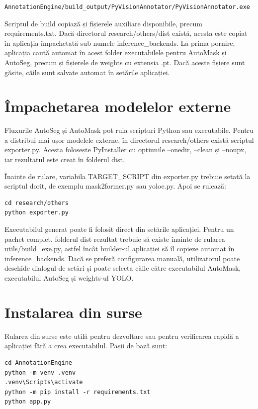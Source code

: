 \begin{verbatim}
AnnotationEngine/build_output/PyVisionAnnotator/PyVisionAnnotator.exe
\end{verbatim}

Scriptul de build copiază și fișierele auxiliare disponibile, precum requirements.txt. Dacă directorul research/others/dist există, acesta este copiat în aplicația împachetată sub numele inference\_backends. La prima pornire, aplicația caută automat în acest folder executabilele pentru AutoMask și AutoSeg, precum și fișierele de weights cu extensia .pt. Dacă aceste fișiere sunt găsite, căile sunt salvate automat în setările aplicației.

\section{Împachetarea modelelor externe}

Fluxurile AutoSeg și AutoMask pot rula scripturi Python sau executabile. Pentru a distribui mai ușor modelele externe, în directorul research/others există scriptul exporter.py. Acesta folosește PyInstaller cu opțiunile --onedir, --clean și --noupx, iar rezultatul este creat în folderul dist.

Înainte de rulare, variabila TARGET\_SCRIPT din exporter.py trebuie setată la scriptul dorit, de exemplu mask2former.py sau yoloe.py. Apoi se rulează:

\begin{verbatim}
cd research/others
python exporter.py
\end{verbatim}

Executabilul generat poate fi folosit direct din setările aplicației. Pentru un pachet complet, folderul dist rezultat trebuie să existe înainte de rularea utils/build\_exe.py, astfel încât builder-ul aplicației să îl copieze automat în inference\_backends. Dacă se preferă configurarea manuală, utilizatorul poate deschide dialogul de setări și poate selecta căile către executabilul AutoMask, executabilul AutoSeg și weights-ul YOLO.

\section{Instalarea din surse}

Rularea din surse este utilă pentru dezvoltare sau pentru verificarea rapidă a aplicației fără a crea executabilul. Pașii de bază sunt:

\begin{verbatim}
cd AnnotationEngine
python -m venv .venv
.venv\Scripts\activate
python -m pip install -r requirements.txt
python app.py
\end{verbatim}

